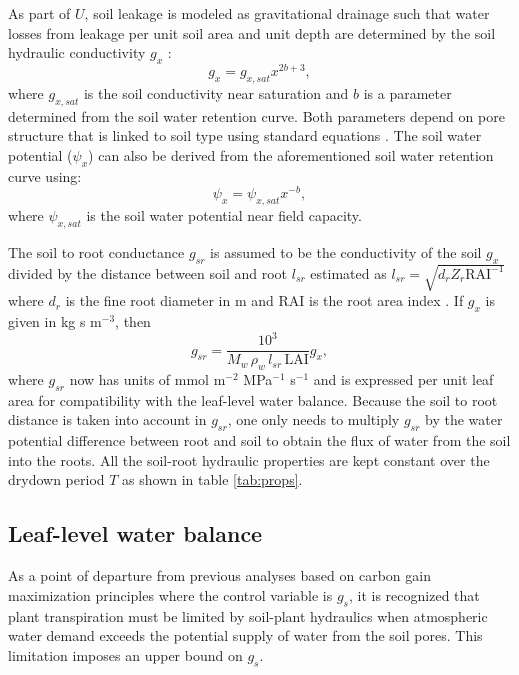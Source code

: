 \documentclass[utf8]{frontiersSCNS} %
\begin{document}
As part of $U$, soil leakage is modeled as gravitational drainage such that water losses from leakage per unit soil area and unit depth are determined by the soil hydraulic conductivity $g_x$ \citep{campbell_introduction_2012}:
\begin{equation}
    \label{eqn:soil_cond}
    g_x = g_{x,sat}x^{2b+3},
\end{equation}
where $g_{x,sat}$ is the soil conductivity near saturation and $b$ is a parameter determined from the soil water retention curve. Both parameters depend on pore structure that is linked to soil type using standard equations \citep{clapp_empirical_1978}. The soil water potential ($\psi_x$) can also be derived from the aforementioned soil water retention curve using:
\begin{equation}
    \label{eqn:Clapp_pot}
    \psi_x = \psi_{x,sat}x^{-b},
\end{equation}
where $\psi_{x,sat}$ is the soil water potential near field capacity.

The soil to root conductance $g_{sr}$ is assumed to be the conductivity of the soil $g_x$ divided by the distance between soil and root $l_{sr}$ estimated as $l_{sr} = \sqrt{d_r Z_r \text{RAI}^{-1}}$ where $d_r$ is the fine root diameter in m and RAI is the root area index \citep{manzoni_optimization_2013}. If $g_x$ is given in kg s m$^{-3}$, then
\begin{equation}
    \label{eqn:soil_root}
    g_{sr} = \frac{10^3}{M_w \, \rho_w \, l_{sr} \, \text{LAI}} g_x, 
\end{equation}
where $g_{sr}$ now has units of mmol m$^{-2}$ MPa$^{-1}$ s$^{-1}$ and is expressed per unit leaf area for compatibility with the leaf-level water balance. Because the soil to root distance is taken into account in $g_{sr}$, one only needs to multiply $g_{sr}$ by the water potential difference between root and soil to obtain the flux of water from the soil into the roots. All the soil-root hydraulic properties are kept constant over the drydown period $T$ as shown in table \ref{tab:props}.

\subsection{Leaf-level water balance}

As a point of departure from previous analyses based on carbon gain maximization principles where the control variable is $g_s$, it is recognized that plant transpiration must be limited by soil-plant hydraulics when atmospheric water demand exceeds the potential supply of water from the soil pores. This limitation imposes an upper bound on $g_s$. 
\end{document}
